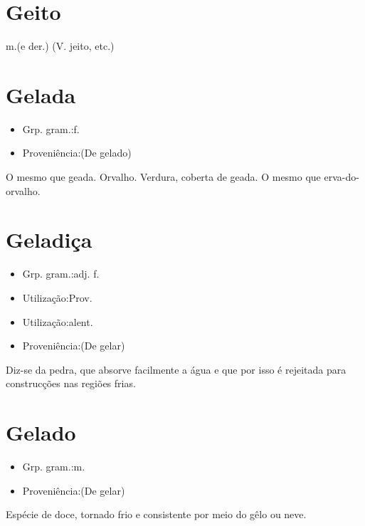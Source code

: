 \section{Geito}
\textunderscore m.\textunderscore  (e der.)
(V. \textunderscore jeito\textunderscore , etc.)
\section{Gelada}
\begin{itemize}
\item {Grp. gram.:f.}
\end{itemize}
\begin{itemize}
\item {Proveniência:(De \textunderscore gelado\textunderscore )}
\end{itemize}
O mesmo que \textunderscore geada\textunderscore .
Orvalho.
Verdura, coberta de geada.
O mesmo que \textunderscore erva-do-orvalho\textunderscore .
\section{Geladiça}
\begin{itemize}
\item {Grp. gram.:adj. f.}
\end{itemize}
\begin{itemize}
\item {Utilização:Prov.}
\end{itemize}
\begin{itemize}
\item {Utilização:alent.}
\end{itemize}
\begin{itemize}
\item {Proveniência:(De \textunderscore gelar\textunderscore )}
\end{itemize}
Diz-se da pedra, que absorve facilmente a água e que por isso é rejeitada para construcções nas regiões frias.
\section{Gelado}
\begin{itemize}
\item {Grp. gram.:m.}
\end{itemize}
\begin{itemize}
\item {Proveniência:(De \textunderscore gelar\textunderscore )}
\end{itemize}
Espécie de doce, tornado frio e consistente por meio do gêlo ou neve.
